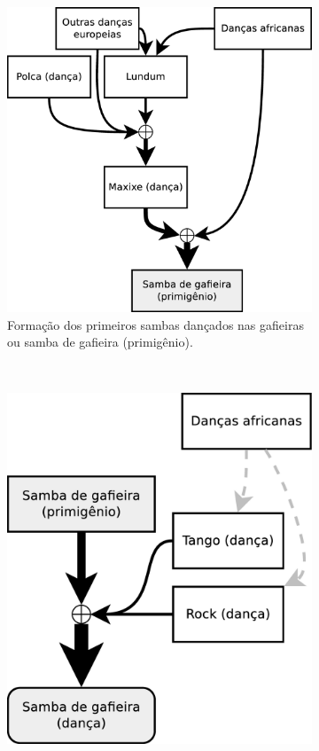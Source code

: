 \begin{figure}[h]
  \centering
  \begin{subfigure}[b]{0.52\textwidth}
    \centering
    \includegraphics[width=\textwidth]{chapters/cap-historia-sambagafieira/sambagafieiraformula.eps}
    \caption{Formação dos primeiros sambas dançados nas gafieiras ou samba de gafieira (primigênio).}
    \label{fig:formuladosambagafieira}
  \end{subfigure}
  ~~
  \begin{subfigure}[b]{0.37\textwidth}
    \centering
    \includegraphics[width=\textwidth]{chapters/cap-historia-sambagafieira/sambagafieiraformula2.eps}

\end{subfigure}
\end{figure}
